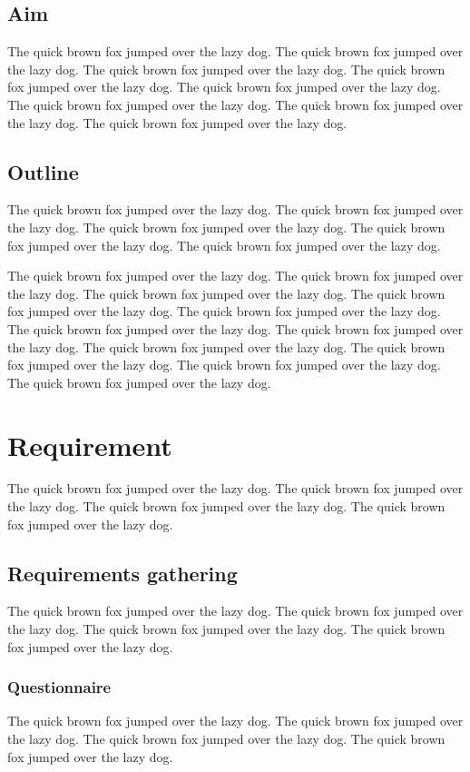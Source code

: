 \documentclass{l4proj}
\begin{document}
\section{Aim}
The quick brown fox jumped over the lazy dog.
The quick brown fox jumped over the lazy dog.
The quick brown fox jumped over the lazy dog.
The quick brown fox jumped over the lazy dog.
The quick brown fox jumped over the lazy dog.
The quick brown fox jumped over the lazy dog.
The quick brown fox jumped over the lazy dog.
The quick brown fox jumped over the lazy dog.

\section{Outline}
The quick brown fox jumped over the lazy dog.
The quick brown fox jumped over the lazy dog.
The quick brown fox jumped over the lazy dog.
The quick brown fox jumped over the lazy dog.
The quick brown fox jumped over the lazy dog.

The quick brown fox jumped over the lazy dog.
The quick brown fox jumped over the lazy dog.
The quick brown fox jumped over the lazy dog.
The quick brown fox jumped over the lazy dog.
The quick brown fox jumped over the lazy dog.
The quick brown fox jumped over the lazy dog.
The quick brown fox jumped over the lazy dog.
The quick brown fox jumped over the lazy dog.
The quick brown fox jumped over the lazy dog.
The quick brown fox jumped over the lazy dog.
The quick brown fox jumped over the lazy dog.

\chapter{Requirement}
The quick brown fox jumped over the lazy dog.
The quick brown fox jumped over the lazy dog.
The quick brown fox jumped over the lazy dog.
The quick brown fox jumped over the lazy dog.

\section{Requirements gathering}
The quick brown fox jumped over the lazy dog.
The quick brown fox jumped over the lazy dog.
The quick brown fox jumped over the lazy dog.
The quick brown fox jumped over the lazy dog.
\subsection{Questionnaire}
The quick brown fox jumped over the lazy dog.
The quick brown fox jumped over the lazy dog.
The quick brown fox jumped over the lazy dog.
The quick brown fox jumped over the lazy dog.
\end{document}

